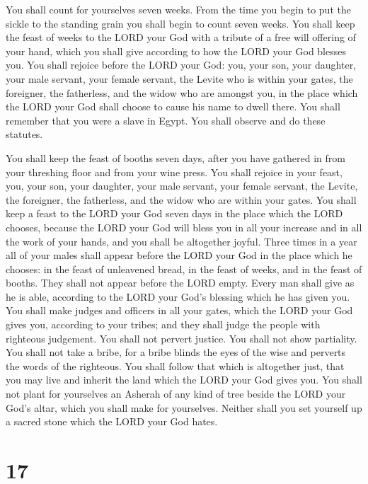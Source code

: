  You shall count for yourselves seven weeks. From the time
you begin to put the sickle to the standing grain you shall begin to
count seven weeks.  You shall keep the feast of weeks to
the LORD your God with a tribute of a free will offering of your hand,
which you shall give according to how the LORD your God blesses you.
 You shall rejoice before the LORD your God: you, your
son, your daughter, your male servant, your female servant, the Levite
who is within your gates, the foreigner, the fatherless, and the widow
who are amongst you, in the place which the LORD your God shall choose
to cause his name to dwell there.  You shall remember
that you were a slave in Egypt. You shall observe and do these statutes.

 You shall keep the feast of booths seven days, after you
have gathered in from your threshing floor and from your wine press.
 You shall rejoice in your feast, you, your son, your
daughter, your male servant, your female servant, the Levite, the
foreigner, the fatherless, and the widow who are within your gates.
 You shall keep a feast to the LORD your God seven days
in the place which the LORD chooses, because the LORD your God will
bless you in all your increase and in all the work of your hands, and
you shall be altogether joyful.  Three times in a year
all of your males shall appear before the LORD your God in the place
which he chooses: in the feast of unleavened bread, in the feast of
weeks, and in the feast of booths. They shall not appear before the LORD
empty.  Every man shall give as he is able, according to
the LORD your God's blessing which he has given you.  You
shall make judges and officers in all your gates, which the LORD your
God gives you, according to your tribes; and they shall judge the people
with righteous judgement.  You shall not pervert justice.
You shall not show partiality. You shall not take a bribe, for a bribe
blinds the eyes of the wise and perverts the words of the righteous.
 You shall follow that which is altogether just, that you
may live and inherit the land which the LORD your God gives you.
 You shall not plant for yourselves an Asherah of any
kind of tree beside the LORD your God's altar, which you shall make for
yourselves.  Neither shall you set yourself up a sacred
stone which the LORD your God hates.

\hypertarget{section-16}{%
\section{17}\label{section-16}}

